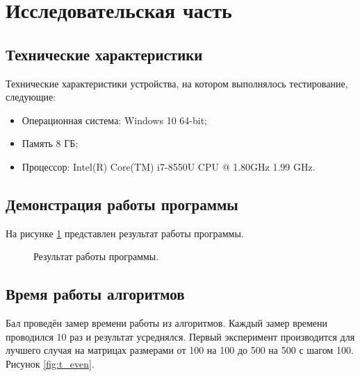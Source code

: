 \section{Исследовательская часть}

\subsection{Технические характеристики}
Технические характеристики устройства, на котором выполнялось тестирование, следующие:
\begin{itemize}
    \item Операционная система: Windows 10 64-bit;
    \item Память 8 ГБ;
    \item Процессор: Intel(R) Core(TM) i7-8550U CPU @ 1.80GHz   1.99 GHz.
\end{itemize}

\subsection{Демонстрация работы программы}
На рисунке \ref{fig:program} представлен результат работы программы.

\begin{figure}[H]
\caption{Результат работы программы.}
\label{fig:program}
\end{figure}

\newpage
\subsection{Время работы алгоритмов}

Бал проведён замер времени работы из алгоритмов. Каждый замер времени проводился 10 раз и результат усреднялся. Первый эксперимент производится для лучшего случая на матрицах размерами от 100 на 100 до 500 на 500 с шагом 100. Рисунок \ref{fig:t_even}.

